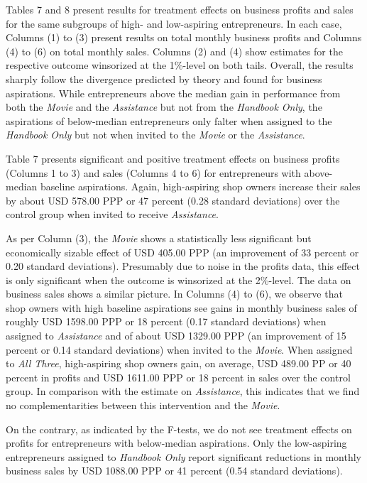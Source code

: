 \documentclass[11.5pt]{article}
\begin{document}
Tables 7 and 8 present results for treatment effects on business profits and sales for the same subgroups of high- and low-aspiring entrepreneurs. In each case, Columns (1) to (3) present results on total monthly business profits and Columns (4) to (6) on total monthly sales. Columns (2) and (4) show estimates for the respective outcome winsorized at the 1\%-level on both tails. Overall, the results sharply follow the divergence predicted by theory and found for business aspirations. While entrepreneurs above the median gain in performance from both the \emph{Movie} and the \emph{Assistance} but not from the \emph{Handbook Only}, the aspirations of below-median entrepreneurs only falter when assigned to the \emph{Handbook Only} but not when invited to the \emph{Movie} or the \emph{Assistance}.

Table 7 presents significant and positive treatment effects on business profits (Columns 1 to 3) and sales (Columns 4 to 6) for entrepreneurs with above-median baseline aspirations. Again, high-aspiring shop owners increase their sales by about USD 578.00 PPP or 47 percent (0.28 standard deviations) over the control group when invited to receive \emph{Assistance}.

As per Column (3), the \emph{Movie} shows a statistically less significant but economically sizable effect of USD 405.00 PPP (an improvement of 33 percent or 0.20 standard deviations). Presumably due to noise in the profits data, this effect is only significant when the outcome is winsorized at the 2\%-level. The data on business sales shows a similar picture. In Columns (4) to (6), we observe that shop owners with high baseline aspirations see gains in monthly business sales of roughly USD 1598.00 PPP or 18 percent (0.17 standard deviations) when assigned to \emph{Assistance} and of about USD 1329.00 PPP (an improvement of 15 percent or 0.14 standard deviations) when invited to the \emph{Movie}. When assigned to \emph{All Three}, high-aspiring shop owners gain, on average, USD 489.00 PP or 40 percent in profits and USD 1611.00 PPP or 18 percent in sales over the control group. In comparison with the estimate on \emph{Assistance}, this indicates that we find no complementarities between this intervention and the \emph{Movie}.

On the contrary, as indicated by the F-tests, we do not see treatment effects on profits for entrepreneurs with below-median aspirations. Only the low-aspiring entrepreneurs assigned to \emph{Handbook Only} report significant reductions in monthly business sales by USD 1088.00 PPP or 41 percent (0.54 standard deviations).
\end{document}
